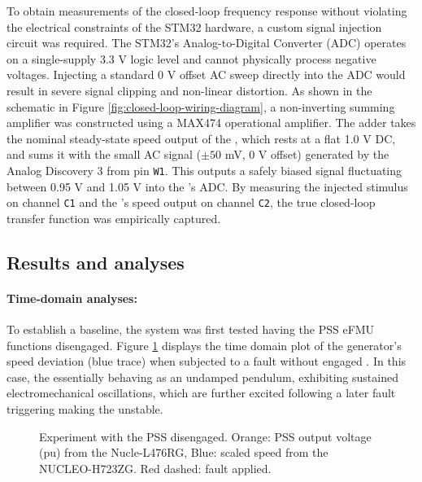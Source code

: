 To obtain measurements of the closed-loop frequency response without violating the electrical constraints of the STM32 hardware, a custom signal injection circuit was required. The STM32's Analog-to-Digital Converter (ADC) operates on a single-supply 3.3 V logic level and cannot physically process negative voltages. Injecting a standard 0 V offset AC sweep directly into the ADC would result in severe signal clipping and non-linear distortion. As shown in the schematic in Figure \ref{fig:closed-loop-wiring-diagram}, a non-inverting summing amplifier was constructed using a MAX474 operational amplifier. The adder takes the nominal steady-state speed output of the \plant{}, which rests at a flat 1.0 V DC, and sums it with the small AC signal ($\pm50$ mV, 0 V offset) generated by the Analog Discovery 3 from pin \texttt{W1}. This outputs a safely biased signal fluctuating between 0.95 V and 1.05 V into the \controller{}'s ADC. By measuring the injected stimulus on channel \texttt{C1} and the \plant{}'s speed output on channel \texttt{C2}, the true closed-loop transfer function was empirically captured.

\subsection{Results and analyses}\label{sec:results-and-analyses}

\paragraph{Time-domain analyses:} To establish a baseline, the system was first tested having the PSS eFMU functions disengaged. Figure \ref{fig:time-plot-no-pss} displays the time domain plot of the generator's speed deviation (blue trace) when subjected to a fault without engaged \controller{}. In this case, the \plant{} essentially behaving as an undamped pendulum, exhibiting sustained electromechanical oscillations, which are further excited following a later fault triggering making the \plant{} unstable.

\begin{figure}[t!]
   \centerline{}
    \caption{Experiment with the PSS disengaged. Orange: PSS output voltage (pu) from the Nucle-L476RG, Blue: scaled speed from the NUCLEO-H723ZG. Red dashed: fault applied.}
    \label{fig:time-plot-no-pss}
    \vspace{-1ex}
\end{figure}

